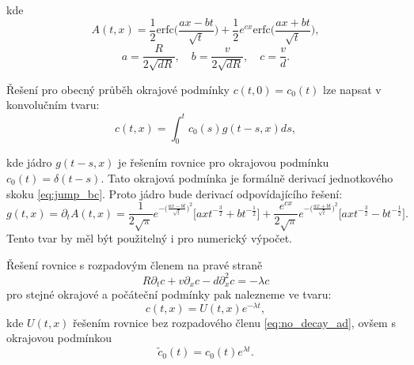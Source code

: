 \documentclass{article}
\def\prtl{\partial}
\begin{document}
kde
\[
    A(t,x) = \frac12 \mathrm{erfc}\Big(\frac{ax-bt}{\sqrt t}\Big)
    + \frac12 e^{cx}\mathrm{erfc}\Big(\frac{ax+bt}{\sqrt t}\Big),
\]
\[
    a = \frac{R}{2\sqrt{dR}},\quad 
    b=\frac{v}{2\sqrt{dR}},\quad 
    c=\frac{v}{d}.
\]

Řešení pro obecný průběh okrajové podmínky $c(t,0) = c_0(t)$ lze napsat v konvolučním tvaru:
\[
    c(t,x) = \int_0^t c_0(s) g(t - s, x) ds,
\]

kde jádro $g(t - s, x)$ je řešením rovnice pro okrajovou podmínku $c_0(t) = \delta(t - s)$. 
Tato okrajová podmínka je formálně derivací jednotkového skoku \eqref{eq:jump_bc}. 
Proto jádro bude derivací odpovídajícího řešení:
\[
    g(t, x) = \prtl_t A(t, x) = 
    \frac{1}{2\sqrt{\pi}} 
    e^{-\big( \frac{ax-bt}{\sqrt{t}}\big)^2}
    \Big[ ax t^{-\frac32} + b t^{-\frac12}\Big]
    + \frac{e^{cx}}{2\sqrt{\pi}}  
    e^{-\big( \frac{ax+bt}{\sqrt{t}}\big)^2}
    \Big[ ax t^{-\frac32} - b t^{-\frac12}\Big].
\]
Tento tvar by měl být použitelný i pro numerický výpočet.


Řešení rovnice s rozpadovým členem na pravé straně
\[
 R\prtl_t c + v \prtl_x c - d \prtl^2_x c = - \lambda c
\]
pro stejné okrajové a počáteční podmínky pak nalezneme ve tvaru:
\[
    c(t,x) = U(t,x) e^{-\lambda t},
\]
kde $U(t,x)$ řešením rovnice bez rozpadového členu \eqref{eq:no_decay_ad}, ovšem s okrajovou podmínkou
\[
    \tilde{c}_0(t) = c_0(t) e^{\lambda t}.
\]






\end{document}
